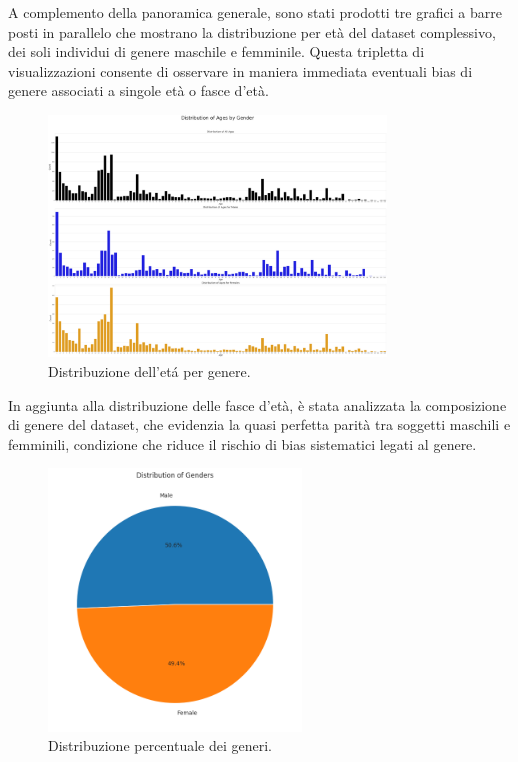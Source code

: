 \documentclass[a4paper,12pt]{report}
\begin{document}
	A complemento della panoramica generale, sono stati prodotti tre grafici a barre posti in parallelo che mostrano la distribuzione per età del dataset complessivo, dei soli individui di genere maschile e femminile. Questa tripletta di visualizzazioni consente di osservare in maniera immediata eventuali bias di genere associati a singole età o fasce d'età. \\
	
	\begin{figure}[H]
		\centering
		\includegraphics[width=0.8\textwidth]{img/ages_bygender_image.png}
		\caption{Distribuzione dell'etá per genere.}
	\end{figure}
	
	In aggiunta alla distribuzione delle fasce d'età, è stata analizzata la composizione di genere del dataset, che evidenzia la quasi perfetta parità tra soggetti maschili e femminili, condizione che riduce il rischio di bias sistematici legati al genere. 
	
	\begin{figure}[H]
		\centering
		\includegraphics[width=0.6\textwidth]{img/pie_gender_images.png}
		\caption{Distribuzione percentuale dei generi.}
	\end{figure}
	
\end{document}
